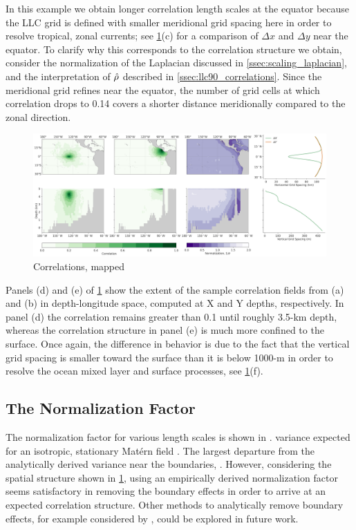 In this example we obtain longer correlation length scales at the equator
because the LLC grid is defined with smaller meridional grid spacing here in
order to resolve tropical, zonal currents;
see \cref{fig:llc90_correlation_maps}(c) for a comparison of $\Delta x $ and
$\Delta y$ near the equator.
To clarify why this corresponds to the correlation structure we obtain,
consider the normalization of the Laplacian discussed in
\cref{ssec:scaling_laplacian}, and the interpretation of $\hat{\rho}$ described
in \cref{ssec:llc90_correlations}.
Since the meridional grid refines near the equator, the number of grid cells at
which correlation drops to 0.14 covers a shorter distance meridionally compared
to the zonal direction.

\begin{figure}
    \centering
    \includegraphics[width=\textwidth]{../figures/huge_correlation_map.jpg}
    \caption{Correlations, mapped}
    \label{fig:llc90_correlation_maps}
\end{figure}

Panels (d) and (e) of \cref{fig:llc90_correlation_maps} show the extent of the
sample correlation fields from (a) and (b) in depth-longitude space,
computed at X and Y depths, respectively.
In panel (d) the correlation remains greater than 0.1 until roughly 3.5-km
depth, whereas the correlation structure in panel (e) is much more confined to
the surface.
Once again, the difference in behavior is due to the fact that the vertical grid
spacing is smaller toward the surface than it is below 1000-m in order to
resolve the ocean mixed layer and surface processes, see
\cref{fig:llc90_correlation_maps}(f).

\subsection{The Normalization Factor}
\label{ssec:llc90_boundary_effects}

The normalization factor for various length scales is shown in .
 variance expected for an isotropic, stationary Mat\'ern
field .
The largest departure from the analytically derived variance near the
boundaries, .
However, considering the spatial structure shown in
\cref{fig:llc90_correlation_maps}, using an empirically derived normalization
factor seems satisfactory in removing the boundary effects in order to arrive at
an expected correlation structure.
Other methods to analytically remove boundary effects, for example considered by
, could be explored in future work.

